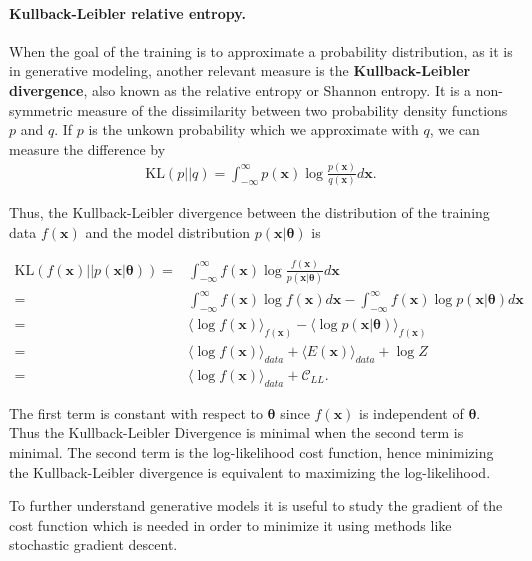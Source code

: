 \documentclass[%
oneside,                 %
final,                   %
10pt]{article}
\begin{document}
\paragraph{Kullback-Leibler relative entropy.}
When the goal of the training is to approximate a probability
distribution, as it is in generative modeling, another relevant
measure is the \textbf{Kullback-Leibler divergence}, also known as the
relative entropy or Shannon entropy. It is a non-symmetric measure of the
dissimilarity between two probability density functions $p$ and
$q$. If $p$ is the unkown probability which we approximate with $q$,
we can measure the difference by
\begin{align}
	\text{KL}(p||q) = \int_{-\infty}^{\infty} p (\bm{x}) \log \frac{p(\bm{x})}{q(\bm{x})}  d\bm{x}.
\end{align}

Thus, the Kullback-Leibler divergence between the distribution of the
training data $f(\bm{x})$ and the model distribution $p(\bm{x}|
\bm{\theta})$ is

\begin{align}
	\text{KL} (f(\bm{x})|| p(\bm{x}| \bm{\theta})) =& \int_{-\infty}^{\infty}
	f (\bm{x}) \log \frac{f(\bm{x})}{p(\bm{x}| \bm{\theta})} d\bm{x} \\
	=& \int_{-\infty}^{\infty} f(\bm{x}) \log f(\bm{x}) d\bm{x} - \int_{-\infty}^{\infty} f(\bm{x}) \log
	p(\bm{x}| \bm{\theta}) d\bm{x} \\
	=& \langle \log f(\bm{x}) \rangle_{f(\bm{x})} - \langle \log p(\bm{x}| \bm{\theta}) \rangle_{f(\bm{x})} \\
	=& \langle \log f(\bm{x}) \rangle_{data} + \langle E(\bm{x}) \rangle_{data} + \log Z \\
	=& \langle \log f(\bm{x}) \rangle_{data} + \mathcal{C}_{LL} .
\end{align}

The first term is constant with respect to $\bm{\theta}$ since $f(\bm{x})$ is independent of $\bm{\theta}$. Thus the Kullback-Leibler Divergence is minimal when the second term is minimal. The second term is the log-likelihood cost function, hence minimizing the Kullback-Leibler divergence is equivalent to maximizing the log-likelihood.


To further understand generative models it is useful to study the
gradient of the cost function which is needed in order to minimize it
using methods like stochastic gradient descent. 
\end{document}
